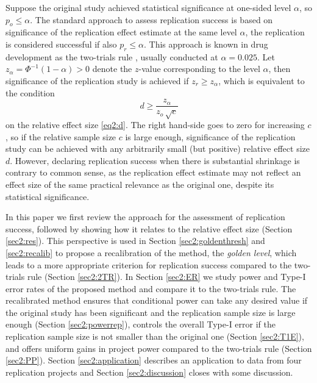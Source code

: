 Suppose the original study achieved statistical significance at one-sided level
$\alpha$, so $p_o \leq \alpha$. The standard approach to assess replication
success is based on significance of the replication effect estimate at the same
level $\alpha$, \ie the replication is considered successful if also
$p_r \leq \alpha$. This approach is known in drug development as the two-trials
rule \citep{Senn2008}, usually conducted at $\alpha=0.025$. Let
$z_\alpha = \Phi^{-1}(1-{\alpha})>0$ denote the $z$-value corresponding to the
level $\alpha$, then significance of the replication study is achieved if
$z_r \geq z_\alpha$, which is equivalent to the condition
\begin{equation}\label{eq2:dSig}
   d \geq \frac{z_\alpha}{z_o  \, \sqrt{c}}
\end{equation}
on the relative effect size \eqref{eq2:d}. The right hand-side goes to zero for
increasing $c$, so if the relative sample size $c$ is large enough, significance
of the replication study can be achieved with any arbitrarily small (but
positive) relative effect size $d$. However, declaring replication success when
there is substantial shrinkage is contrary to common sense, as the replication
effect estimate may not reflect an effect size of the same practical relevance
as the original one, despite its statistical significance.

In this paper we first review the \citet{Held2020} approach for the assessment
of replication success, followed by showing how it relates to the relative
effect size (Section \ref{sec2:res}). This perspective is used in Section
\ref{sec2:goldenthresh} and \ref{sec2:recalib} to propose a recalibration of the
method, the \textit{golden level}, which leads to a more appropriate criterion
for replication success compared to the two-trials rule (Section \ref{sec2:2TR}).
In Section \ref{sec2:ER} we study power and Type-I error rates of the proposed
method and compare it to the two-trials rule. The recalibrated method ensures
that conditional power can take any desired value if the original study has been
significant and the replication sample size is large enough (Section
\ref{sec2:powerrep}), controls the overall Type-I error if the replication sample
size is not smaller than the original one (Section \ref{sec2:T1E}), and offers
uniform gains in project power compared to the two-trials rule (Section
\ref{sec2:PP}). Section \ref{sec2:application} describes an application to data
from four replication projects and Section \ref{sec2:discussion} closes with some
discussion.

